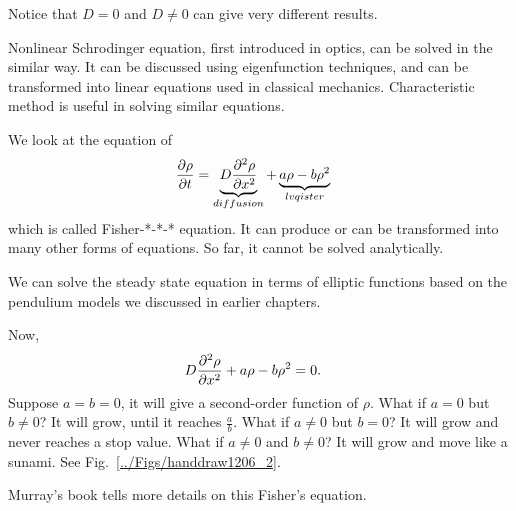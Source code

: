 Notice that $ D=0 $ and $ D\neq 0 $ can give very different results. 

Nonlinear Schrodinger equation, first introduced in optics, can be solved in the similar way. It can be discussed using eigenfunction techniques, and can be transformed into linear equations used in classical mechanics. Characteristic method is useful in solving similar equations. 



We look at the equation of 
\begin{align}
\frac{\partial {\rho}}{\partial t} &= \underbrace{D \frac{\partial^2 {\rho}}{\partial x^2}}_{diffusion} + \underbrace{a\rho -b\rho^2}_{lvqister}
\end{align}
which is called Fisher-*-*-* equation. It can produce or can be transformed into many other forms of equations. So far, it cannot be solved analytically. 

We can solve the steady state equation in terms of elliptic functions based on the pendulium models we discussed in earlier chapters. 

Now, 
\begin{align}
D \frac{\partial^2 {\rho}}{\partial x^2} + a\rho -b\rho^2 &=0.
\end{align}
Suppose $ a=b=0 $, it will give a second-order function of $ \rho $. What if $ a=0 $ but $ b\neq 0 $? It will grow, until it reaches $ \frac{a}{b} $. What if $ a\neq 0 $ but $ b=0 $? It will grow and never reaches a stop value. What if $ a\neq 0 $ and $ b\neq 0 $? It will grow and move like a sunami. See Fig.~\ref{../Figs/handdraw1206_2}. 

Murray's book tells more details on this Fisher's equation. 
